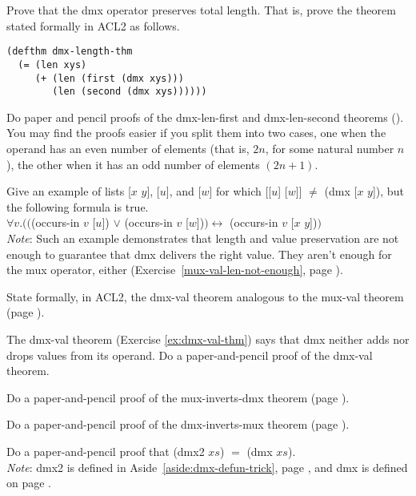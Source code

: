\begin{ExerciseList}
\Exercise
Prove that the \textsf{dmx} operator preserves total length.
That is, prove the theorem
stated formally in ACL2 as follows.

\label{thm:dmx-length}
\begin{Verbatim}
(defthm dmx-length-thm
  (= (len xys)
     (+ (len (first (dmx xys)))
        (len (second (dmx xys))))))
\end{Verbatim}

\Exercise
Do paper and pencil proofs of the dmx-len-first and dmx-len-second
theorems (\pageref{thm:dmx-length-first-second}).
You may find the proofs easier if you split them into
two cases, one when the operand has an even number of elements
(that is, $2n$, for some natural number $n$),
the other when it has an odd number of elements $(2n+1)$.

\Exercise\label{dmx-val-len-not-enough}
Give an example of lists
\textsf{[$x$ $y$]}, \textsf{[$u$]}, and \textsf{[$w$]} for which
\textsf{[[$u$] [$w$]]} $\neq$ \textsf{(dmx [$x$ $y$])}, but the following formula is true.\\
\hspace*{1cm}$\forall v.(($\textsf{(occurs-in $v$ [$u$])} $\vee$ \textsf{(occurs-in $v$ [$w$])}$)
\leftrightarrow$ \textsf{(occurs-in $v$ [$x$ $y$])}$)$\\
\emph{Note}: Such an example demonstrates that length and value
preservation are not enough to guarantee that \textsf{dmx} delivers the right value.
They aren't enough for the \textsf{mux} operator, either
(Exercise~\ref{mux-val-len-not-enough}, page \pageref{mux-val-len-not-enough}).

\Exercise [label={ex:dmx-val-thm}]
State formally, in ACL2, the dmx-val theorem
analogous to the mux-val theorem (page \pageref{defthm:mux-val}).

\Exercise
The dmx-val theorem (Exercise \ref{ex:dmx-val-thm})
says that \textsf{dmx} neither adds nor drops values from its operand.
Do a paper-and-pencil proof of the dmx-val theorem.

\Exercise {}
Do a paper-and-pencil proof of the mux-inverts-dmx theorem
(page \pageref{thm:mux-inverts-dmx}).

\Exercise
Do a paper-and-pencil proof of the dmx-inverts-mux theorem
(page \pageref{thm:dmx-inverts-mux}).

\Exercise
\label{dmx2-eq-dmx}
Do a paper-and-pencil proof that
\textsf{(dmx2 $xs$)} $=$ \textsf{(dmx $xs$)}.\\
\emph{Note}: \textsf{dmx2} is defined in
Aside~\ref{aside:dmx-defun-trick}, page \pageref{aside:dmx-defun-trick},
and \textsf{dmx} is defined on page \pageref{dmx-defun}.

\end{ExerciseList}
